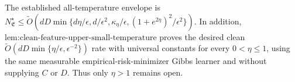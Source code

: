 The established all-temperature envelope is \(N^\star_{\mathfrak E}\le\widetilde O(dD\min\{d\eta/\epsilon,d/\epsilon^2,\kappa_\eta/\epsilon,(1+e^{2\eta})^2/\epsilon^2\})\). In addition, \(\text{lem:clean-feature-upper-small-temperature}\) proves the desired clean \(\widetilde O(dD\min\{\eta/\epsilon,\epsilon^{-2}\})\) rate with universal constants for every \(0<\eta\le1\), using the same measurable empirical-risk-minimizer Gibbs learner and without supplying \(C\) or \(D\). Thus only \(\eta>1\) remains open.